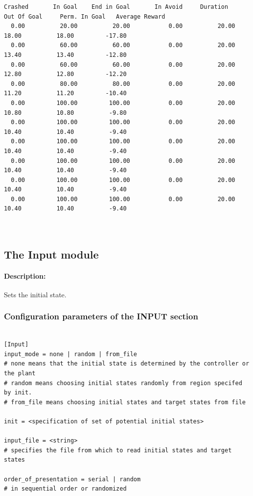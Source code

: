 \documentclass[a4paper,12pt,german]{article}
\begin{document}
\begin{footnotesize}
\begin{verbatim}
Crashed       In Goal    End in Goal       In Avoid     Duration     Out Of Goal     Perm. In Goal   Average Reward     
  0.00          20.00          20.00           0.00          20.00      18.00          18.00         -17.80           
  0.00          60.00          60.00           0.00          20.00      13.40          13.40         -12.80          
  0.00          60.00          60.00           0.00          20.00      12.80          12.80         -12.20             
  0.00          80.00          80.00           0.00          20.00      11.20          11.20         -10.40           
  0.00         100.00         100.00           0.00          20.00      10.80          10.80          -9.80        
  0.00         100.00         100.00           0.00          20.00      10.40          10.40          -9.40          
  0.00         100.00         100.00           0.00          20.00      10.40          10.40          -9.40           
  0.00         100.00         100.00           0.00          20.00      10.40          10.40          -9.40           
  0.00         100.00         100.00           0.00          20.00      10.40          10.40          -9.40      
  0.00         100.00         100.00           0.00          20.00      10.40          10.40          -9.40          



\end{verbatim}
\end{footnotesize}


\subsection{The Input module}

\paragraph{Description:} Sets the initial state.

\subsubsection{Configuration parameters of the INPUT section}

\begin{footnotesize}
\begin{verbatim}

[Input]
input_mode = none | random | from_file 
# none means that the initial state is determined by the controller or the plant
# random means choosing initial states randomly from region specifed by init. 
# from_file means choosing initial states and target states from file

init = <specification of set of potential initial states> 

input_file = <string>  
# specifies the file from which to read initial states and target states

order_of_presentation = serial | random 
# in sequential order or randomized

\end{verbatim}
\end{footnotesize}
\end{document}
